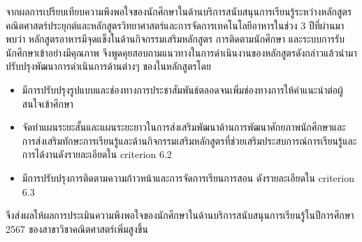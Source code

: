 จากผลการเปรียบเทียบความพึงพอใจของนักศึกษาในด้านบริการสนับสนุนการเรียนรู้ระหว่างหลักสูตรคณิตศาสตร์ประยุกต์และหลักสูตรวิทยาศาสตร์และการจัดการเทคโนโลยีอาหารในช่วง 3 ปีที่ผ่านมา พบว่า หลักสูตรอาหารมีจุดแข็งในด้านกิจกรรมเสริมหลักสูตร การติดตามนักศึกษา และระบบการรับนักศึกษาเข้าอย่างมีคุณภาพ จึงพูดคุยสอบถามแนวทางในการดำเนินงานของหลักสูตรดังกล่าวแล้วนำมาปรับปรุงพัฒนาการดำเนินการด้านต่างๆ ของในหลักสูตรโดย
\begin{itemize}
	\item มีการปรับปรุงรูปแบบและช่องทางการประชาสัมพันธ์ตลอดจนเพิ่มช่องทางการให้คำแนะนำต่อผู้สนใจเข้าศึกษา 
	\item จัดทำแผนระยะสั้นและแผนระยะยาวในการส่งเสริมพัฒนาด้านการพัฒนาศักยภาพนักศึกษาและการส่งเสริมทักษะการเรียนรู้และด้านกิจกรรมเสริมหลักสูตรที่ช่วยเสริมประสบการณ์การเรียนรู้และการได้งานดังรายละเอียดใน criterion 6.2
	\item มีการปรับปรุงการติดตามความก้าวหน้าและการจัดการเรียนการสอน ดังรายละเอียดใน criterion 6.3
\end{itemize}
จึงส่งผลให้ผลการประเมินความพึงพอใจของนักศึกษาในด้านบริการสนับสนุนการเรียนรู้ในปีการศึกษา 2567 ของสาขาวิชาคณิตศาสตร์เพิ่มสูงขึ้น

\begin{doclist}
	
\end{doclist}









